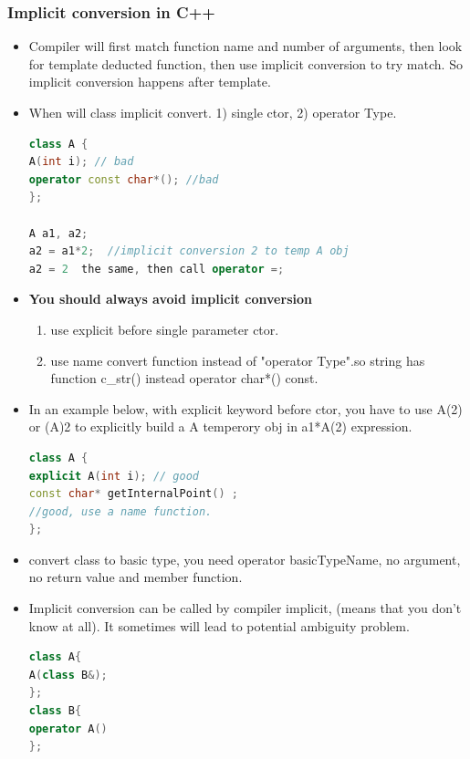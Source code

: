 \documentclass[a4paper,12pt,twoside]{book}
\begin{document}
\subsubsection{Implicit conversion in C++}
\begin{itemize}
\item Compiler will first match function name and number of arguments, then look for template deducted function, then use implicit conversion to try match. So implicit conversion happens after template.

\item When will class implicit convert. 1) single ctor, 2) operator Type.
\begin{lstlisting}[frame=single, language=c++]
class A {
A(int i); // bad
operator const char*(); //bad
};

A a1, a2;
a2 = a1*2;  //implicit conversion 2 to temp A obj
a2 = 2  the same, then call operator =;
\end{lstlisting}

\item \textbf{You should always avoid implicit conversion}
\begin{enumerate}
\item use explicit before single parameter ctor.
\item use name convert function instead of  "operator Type".so string has function c\_str() instead operator char*() const. 
\end{enumerate}

\item In an example below, with explicit keyword before ctor,  you have to use A(2) or (A)2 to explicitly build a A temperory obj in a1*A(2) expression.
\begin{lstlisting}[frame=single, language=c++]
class A {
explicit A(int i); // good
const char* getInternalPoint() ;
//good, use a name function.
};
\end{lstlisting}

\item  convert class to basic type, you need operator basicTypeName, no argument, no return value and member function.

\item Implicit conversion can be called by compiler implicit, (means that you don't know at all). It sometimes will lead to potential ambiguity problem.
\begin{lstlisting}[frame=single, language=c++]
class A{
A(class B&);
};
class B{
operator A()
};


\end{lstlisting}
\end{itemize}
\end{document}
